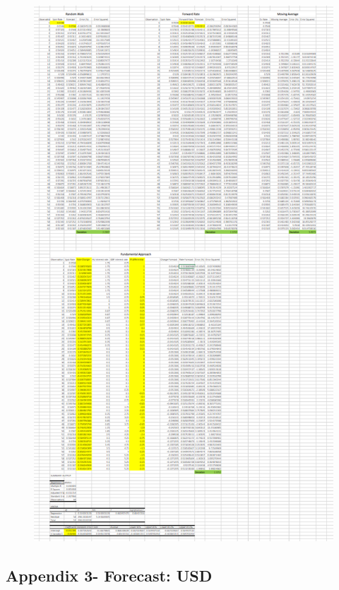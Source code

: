 \documentclass{article}
\let\Oldsubsection\subsection
\renewcommand{\subsection}{\FloatBarrier\Oldsubsection}
\begin{document}
\begin{figure}[h!]
    \centering
    \includegraphics[scale=0.5]{forecasts/GBP.png}
\end{figure}

\break

\subsection*{Appendix 3- Forecast: USD}
\end{document}

